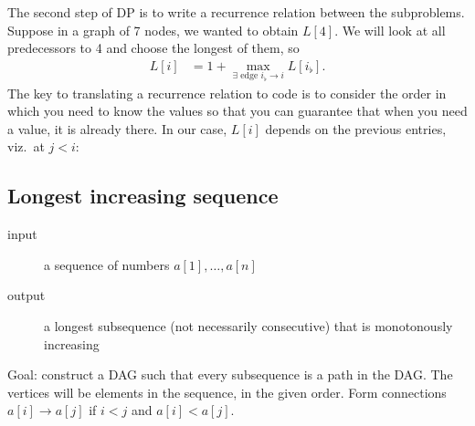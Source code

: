 The second step of DP is to write a recurrence relation between the subproblems.
Suppose in a graph of 7 nodes, we wanted to obtain \(L[4]\).
We will look at all predecessors to 4 and choose the longest of them,
so 
\begin{align}
	L[i] &= 1 + \max_{\text{\(\exists\) edge \(i_\flat\to i\)} } L\left[i_\flat\right].
\end{align}
The key to translating a recurrence relation to code
is to consider the order in which you need to know the values so that you can guarantee that
when you need a value, it is already there.
In our case, \(L\left[i\right]\) depends on the previous entries, viz.~at \(j< i\):

\subsection{Longest increasing sequence}
\begin{description}
	\item[input] a sequence of numbers \(a[1], \ldots, a[n]\)
	\item[output] a longest subsequence (not necessarily consecutive) that is monotonously increasing
\end{description}

Goal: construct a DAG such that every subsequence is a path in the DAG.
The vertices will be elements in the sequence, in the given order.
Form connections \(a[i]\to a[j]\) if \(i < j\) and \(a[i] < a[j]\).